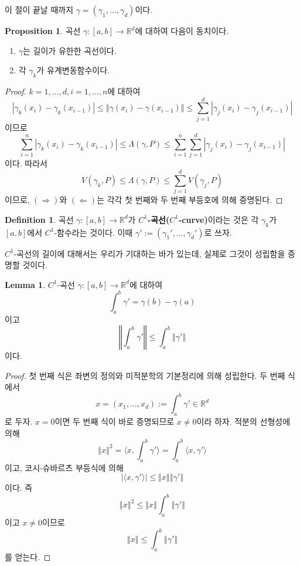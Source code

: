 \documentclass[11pt]{book}
\numberwithin{equation}{chapter}
\def\RR{\mathbb{R}}
\newcommand{\inner}[2]{\langle#1, #2\rangle}
\newcommand{\abs}[1]{\left\vert#1\right\vert}
\newcommand{\norm}[1]{\left\Vert#1\right\Vert}
\theoremstyle{definition}
\newtheorem{lem}[thm]{Lemma}
\newtheorem{prop}[thm]{Proposition}
\newtheorem{defn}[thm]{Definition}
\newenvironment{enum}
	{\begin{enumerate}[label=(\alph*), leftmargin=2\parindent]}
	{\end{enumerate}}
\begin{document}
이 절이 끝날 때까지 \(\gamma = (\gamma_1, \ldots, \gamma_d)\)이다.

\begin{prop}
    곡선 \(\gamma : [a, b] \to \RR^d\)에 대하여 다음이 동치이다.
    \begin{enum}
        \item \(\gamma\)는 길이가 유한한 곡선이다.
        \item 각 \(\gamma_k\)가 유계변동함수이다.
    \end{enum}
\end{prop}

\begin{proof}
    \(k = 1, \ldots, d, i = 1, \ldots, n\)에 대하여
    \[
        \abs{\gamma_k(x_i) - \gamma_k(x_{i-1})} \le \norm{\gamma(x_i) - \gamma(x_{i-1})} \le \sum_{j=1}^d \abs{\gamma_j(x_i) - \gamma_j(x_{i-1})}
    \]
    이므로
    \[
        \sum_{i=1}^n \abs{\gamma_k(x_i) - \gamma_k(x_{i-1})} \le \Lambda(\gamma, P) \le \sum_{i=1}^n\sum_{j=1}^d \abs{\gamma_j(x_i) - \gamma_j(x_{i-1})}
    \]
    이다. 따라서
    \[
        V(\gamma_k, P) \le \Lambda(\gamma, P) \le \sum_{j=1}^d V(\gamma_j, P)
    \]
    이므로, \((\Rightarrow)\)와 \((\Leftarrow)\)는 각각 첫 번째와 두 번째 부등호에 의해 증명된다.
\end{proof}

\begin{defn}
    곡선 \(\gamma : [a, b] \to \RR^d\)가 \textbf{\(C^1\)-곡선(\(C^1\)-curve)}이라는 것은 각 \(\gamma_k\)가 \([a, b]\)에서 \(C^1\)-함수라는 것이다. 이때 \(\gamma' := (\gamma_1', \ldots, \gamma_d')\)로 쓰자.
\end{defn}

\(C^1\)-곡선의 길이에 대해서는 우리가 기대하는 바가 있는데, 실제로 그것이 성립함을 증명할 것이다.

\begin{lem}
    \(C^1\)-곡선 \(\gamma : [a, b] \to \RR^d\)에 대하여
    \[
        \int_a^b \gamma' = \gamma(b) - \gamma(a)
    \]
    이고
    \[
        \norm{\int_a^b \gamma'} \le \int_a^b \norm{\gamma'}
    \]
    이다.
\end{lem}
\begin{proof}
    첫 번째 식은 좌변의 정의와 미적분학의 기본정리에 의해 성립한다. 두 번째 식에서
    \[
        x = (x_1, \ldots, x_d) := \int_a^b \gamma' \in \RR^d
    \]
    로 두자. \(x = 0\)이면 두 번째 식이 바로 증명되므로 \(x \ne 0\)이라 하자. 적분의 선형성에 의해
    \[
        \norm{x}^2 = \inner{x}{\int_a^b \gamma'} = \int_a^b \inner{x}{\gamma'}
    \]
    이고, 코시-슈바르츠 부등식에 의해
    \[
        \abs{\inner{x}{\gamma'}} \le \norm{x}\norm{\gamma'}
    \]
    이다. 즉
    \[
        \norm{x}^2 \le \norm{x} \int_a^b \norm{\gamma'}
    \]
    이고 \(x \ne 0\)이므로
    \[
        \norm{x} \le \int_a^b \norm{\gamma'}
    \]
    를 얻는다.
\end{proof}
\end{document}
